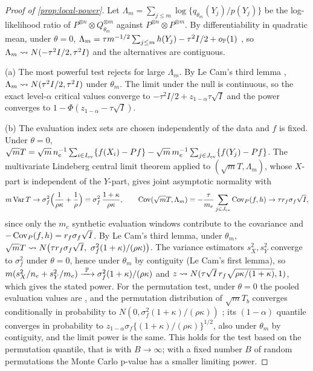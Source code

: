 \begin{proof}[Proof of \cref{prop:local-power}]
Let $\Lambda_m=\sum_{j\le m}\log\{q_{\theta_m}(Y_j)/p(Y_j)\}$ be the log-likelihood ratio of
$P^{\otimes n}\otimes Q_{\theta_m}^{\otimes m}$ against $P^{\otimes n}\otimes P^{\otimes m}$. By
differentiability in quadratic mean, under $\theta=0$,
$\Lambda_m=\tau m^{-1/2}\sum_{j\le m}h(Y_j)-\tau^2I/2+o_{\mathbb{P}}(1)$ \citep[Thm.~7.2]{vandervaart_1998_asymptotic},
so $\Lambda_m\rightsquigarrow N(-\tau^2I/2,\tau^2I)$ and the alternatives are contiguous.

(a) The most powerful test rejects for large $\Lambda_m$. By Le Cam's third lemma
\citep[Ex.~6.7]{vandervaart_1998_asymptotic}, $\Lambda_m\rightsquigarrow N(\tau^2I/2,\tau^2I)$ under $\theta_m$.
The limit under the null is continuous, so the exact level-$\alpha$ critical values converge to
$-\tau^2I/2+z_{1-\alpha}\tau\sqrt I$ and the power converges to $1-\Phi(z_{1-\alpha}-\tau\sqrt I)$.

(b) The evaluation index sets are chosen independently of the data and $f$ is fixed. Under
$\theta=0$,
$\sqrt mT=\sqrt m\,n_e^{-1}\sum_{i\in I_{\mathrm{ev}}}\{f(X_i)-Pf\}-\sqrt m\,m_e^{-1}\sum_{j\in J_{\mathrm{ev}}}\{f(Y_j)-Pf\}$.
The multivariate Lindeberg central limit theorem applied to $(\sqrt mT,\Lambda_m)$, whose $X$-part
is independent of the $Y$-part, gives joint asymptotic normality with
\[
  m\operatorname{Var} T\to\sigma_f^2\Big(\frac1{\rho\kappa}+\frac1\rho\Big)=\sigma_f^2\,\frac{1+\kappa}{\rho\kappa},
  \qquad
  \operatorname{Cov}(\sqrt mT,\Lambda_m)=-\frac{\tau}{m_e}\sum_{j\in J_{\mathrm{ev}}}\operatorname{Cov}_P(f,h)\to\tau r_f\sigma_f\sqrt I ,
\]
since only the $m_e$ synthetic evaluation windows contribute to the covariance and
$-\operatorname{Cov}_P(f,h)=r_f\sigma_f\sqrt I$. By Le Cam's third lemma, under $\theta_m$,
$\sqrt mT\dto N\big(\tau r_f\sigma_f\sqrt I,\ \sigma_f^2(1+\kappa)/(\rho\kappa)\big)$. The variance
estimators $s_X^2,s_Y^2$ converge to $\sigma_f^2$ under $\theta=0$, hence under $\theta_m$ by
contiguity (Le Cam's first lemma), so $m(s_X^2/n_e+s_Y^2/m_e)\xrightarrow{\ \mathbb{P}\ }\sigma_f^2(1+\kappa)/(\rho\kappa)$
and $z\rightsquigarrow N(\tau\sqrt I\,r_f\sqrt{\rho\kappa/(1+\kappa)},1)$, which gives the stated power. For the
permutation test, under $\theta=0$ the pooled evaluation values are \iid, and the permutation
distribution of $\sqrt mT_b$ converges conditionally in probability to
$N(0,\sigma_f^2(1+\kappa)/(\rho\kappa))$ \citep{hoeffding_1952_large}; its $(1-\alpha)$ quantile
converges in probability to $z_{1-\alpha}\sigma_f\{(1+\kappa)/(\rho\kappa)\}^{1/2}$, also under
$\theta_m$ by contiguity, and the limit power is the same. This holds for the test based on the
permutation quantile, that is with $B\to\infty$; with a fixed number $B$ of random permutations the
Monte Carlo p-value has a smaller limiting power.


\end{proof}
